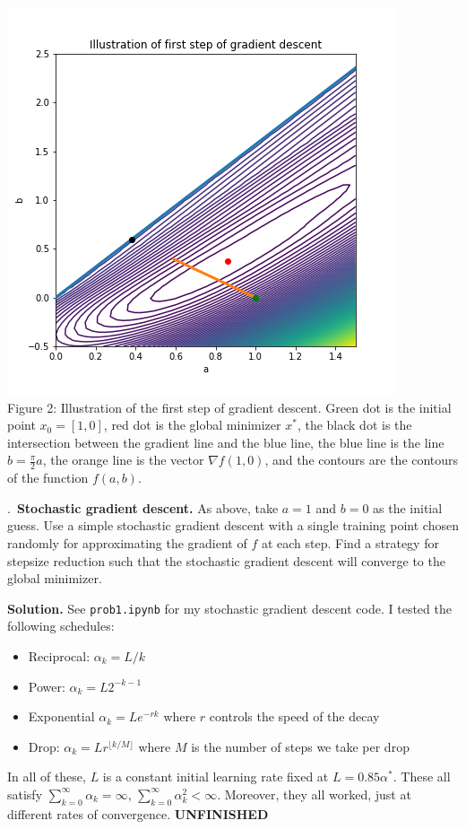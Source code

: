 \documentclass{letter}
\newcounter{problem}
\newcommand{\Problem}[2]{%
	\stepcounter{problem}%
	\leftskip=0pt%
	\theproblem.~\textbf{{#1.}} #2 \par%
}
\newcommand{\Solution}[1]{%
	\textbf{Solution.} #1 \par%
}
\newcommand{\UNFINISHED}{\textbf{\color{red} UNFINISHED}}
\begin{document}
{    \begin{center}
        \includegraphics{../pics/gd_firststep.png} \\
        Figure 2: Illustration of the first step of gradient descent. Green dot is the initial point $x_0 = [1, 0]$, red dot is the global minimizer $x^*$, the black dot is the intersection between the gradient line and the blue line, the blue line is the line $b = \frac{\pi}{2}a$, the orange line is the vector $\nabla f(1, 0)$, and the contours are the contours of the function $f(a, b)$.
    \end{center}}

    \Problem{Stochastic gradient descent}{As above, take $a = 1$ and $b = 0$ as the initial guess. Use a simple stochastic gradient descent with a single training point chosen randomly for approximating the gradient of $f$ at each step. Find a strategy for stepsize reduction such that the stochastic gradient descent will converge to the global minimizer.}
    \Solution{See \texttt{prob1.ipynb} for my stochastic gradient descent code. I tested the following schedules: \begin{itemize}
        \item Reciprocal: $\alpha_k = L/k$
        \item Power: $\alpha_k = L2^{-k-1}$
        \item Exponential $\alpha_k = Le^{-rk}$ where $r$ controls the speed of the decay
        \item Drop: $\alpha_k = Lr^{\lfloor k/M \rfloor}$ where $M$ is the number of steps we take per drop
    \end{itemize} In all of these, $L$ is a constant initial learning rate fixed at $L = 0.85\alpha^*$. These all satisfy $\sum_{k=0}^\infty \alpha_k = \infty$, $\sum_{k=0}^\infty \alpha_k^2 < \infty$. Moreover, they all worked, just at different rates of convergence. \UNFINISHED}
\end{document}
